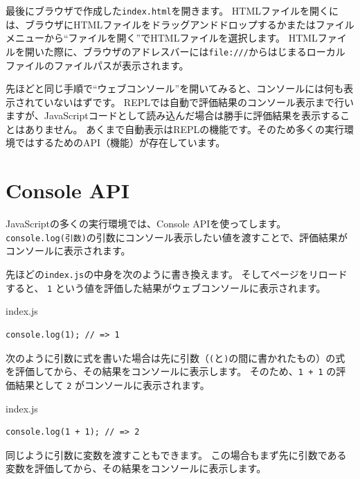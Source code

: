 最後にブラウザで作成した\texttt{index.html}を開きます。
HTMLファイルを開くには、ブラウザにHTMLファイルをドラッグアンドドロップするかまたはファイルメニューから``ファイルを開く''でHTMLファイルを選択します。
HTMLファイルを開いた際に、ブラウザのアドレスバーには\texttt{file:///}からはじまるローカルファイルのファイルパスが表示されます。

先ほどと同じ手順で``ウェブコンソール''を開いてみると、コンソールには何も表示されていないはずです。
REPLでは自動で評価結果のコンソール表示まで行いますが、JavaScriptコードとして読み込んだ場合は勝手に評価結果を表示することはありません。
あくまで自動表示はREPLの機能です。そのため多くの実行環境では\textbf{}するためのAPI（機能）が存在しています。

\hypertarget{console-api}{%
\section{Console API}\label{console-api}}

JavaScriptの多くの実行環境では、Console
APIを使って\textbf{}します。
\texttt{console.log(引数)}の引数にコンソール表示したい値を渡すことで、評価結果がコンソールに表示されます。

先ほどの\texttt{index.js}の中身を次のように書き換えます。
そしてページをリロードすると、 \texttt{1}
という値を評価した結果がウェブコンソールに表示されます。

\begin{listtitle}
index.js
\end{listtitle}
\begin{lstlisting}
console.log(1); // => 1
\end{lstlisting}
\listend

次のように引数に式を書いた場合は先に引数（\texttt{(}と\texttt{)}の間に書かれたもの）の式を評価してから、その結果をコンソールに表示します。
そのため、\texttt{1 + 1} の評価結果として
\texttt{2} がコンソールに表示されます。

\begin{listtitle}
index.js
\end{listtitle}
\begin{lstlisting}
console.log(1 + 1); // => 2
\end{lstlisting}
\listend

同じように引数に変数を渡すこともできます。
この場合もまず先に引数である変数を評価してから、その結果をコンソールに表示します。

